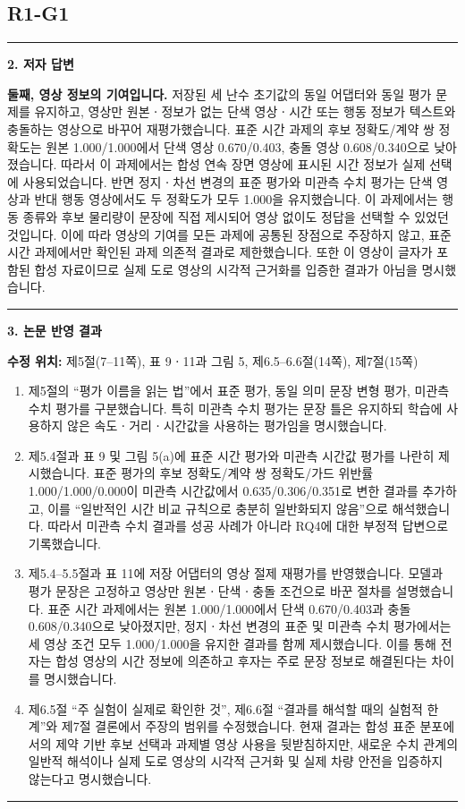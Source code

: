 \documentclass[11pt]{article}
\newcommand{\fieldheading}[2]{%
  \par\medskip\noindent
  {\color{#1}\rule{3pt}{1.25em}}\hspace{0.55em}\textbf{#2}\par\smallskip}
\newenvironment{reviewitem}[1]
  {\subsection*{#1}}
  {\par\medskip\hrule\bigskip}
\newenvironment{authorresponse}
  {\fieldheading{responsecolor}{2. 저자 답변}}
  {\par}
\newenvironment{manuscriptrevision}[1]
  {\fieldheading{revisioncolor}{3. 논문 반영 결과}%
   \textbf{수정 위치:} #1\par\smallskip}
  {\par}
\begin{document}
\begin{reviewitem}{R1-G1}
\begin{authorresponse}
    \textbf{둘째, 영상 정보의 기여입니다.} 저장된 세 난수 초기값의 동일 어댑터와
    동일 평가 문제를 유지하고, 영상만 원본ㆍ정보가 없는 단색 영상ㆍ시간 또는 행동
    정보가 텍스트와 충돌하는 영상으로 바꾸어 재평가했습니다. 표준 시간 과제의 후보
    정확도/계약 쌍 정확도는 원본 1.000/1.000에서 단색 영상 0.670/0.403, 충돌 영상
    0.608/0.340으로 낮아졌습니다. 따라서 이 과제에서는 합성 연속 장면 영상에 표시된
    시간 정보가 실제 선택에 사용되었습니다. 반면 정지ㆍ차선 변경의 표준 평가와
    미관측 수치 평가는 단색 영상과 반대 행동 영상에서도 두 정확도가 모두 1.000을
    유지했습니다. 이 과제에서는 행동 종류와 후보 물리량이 문장에 직접 제시되어
    영상 없이도 정답을 선택할 수 있었던 것입니다. 이에 따라 영상의 기여를 모든
    과제에 공통된 장점으로 주장하지 않고, 표준 시간 과제에서만 확인된 과제 의존적
    결과로 제한했습니다. 또한 이 영상이 글자가 포함된 합성 자료이므로 실제 도로
    영상의 시각적 근거화를 입증한 결과가 아님을 명시했습니다.
  \end{authorresponse}

  \begin{manuscriptrevision}{제5절(7--11쪽), 표 9ㆍ11과 그림 5, 제6.5--6.6절(14쪽), 제7절(15쪽)}
    \begin{enumerate}
      \item 제5절의 ``평가 이름을 읽는 법''에서 표준 평가, 동일 의미 문장 변형
      평가, 미관측 수치 평가를 구분했습니다. 특히 미관측 수치 평가는 문장 틀은
      유지하되 학습에 사용하지 않은 속도ㆍ거리ㆍ시간값을 사용하는 평가임을
      명시했습니다.

      \item 제5.4절과 표 9 및 그림 5(a)에 표준 시간 평가와 미관측 시간값 평가를
      나란히 제시했습니다. 표준 평가의 후보 정확도/계약 쌍 정확도/가드 위반률
      1.000/1.000/0.000이 미관측 시간값에서 0.635/0.306/0.351로 변한 결과를
      추가하고, 이를 ``일반적인 시간 비교 규칙으로 충분히 일반화되지 않음''으로
      해석했습니다. 따라서 미관측 수치 결과를 성공 사례가 아니라 RQ4에 대한
      부정적 답변으로 기록했습니다.

      \item 제5.4--5.5절과 표 11에 저장 어댑터의 영상 절제 재평가를 반영했습니다.
      모델과 평가 문장은 고정하고 영상만 원본ㆍ단색ㆍ충돌 조건으로 바꾼 절차를
      설명했습니다. 표준 시간 과제에서는 원본 1.000/1.000에서 단색
      0.670/0.403과 충돌 0.608/0.340으로 낮아졌지만, 정지ㆍ차선 변경의 표준 및
      미관측 수치 평가에서는 세 영상 조건 모두 1.000/1.000을 유지한 결과를 함께
      제시했습니다. 이를 통해 전자는 합성 영상의 시간 정보에 의존하고 후자는 주로
      문장 정보로 해결된다는 차이를 명시했습니다.

      \item 제6.5절 ``주 실험이 실제로 확인한 것'', 제6.6절 ``결과를 해석할 때의
      실험적 한계''와 제7절 결론에서 주장의 범위를 수정했습니다. 현재 결과는 합성
      표준 분포에서의 제약 기반 후보 선택과 과제별 영상 사용을 뒷받침하지만,
      새로운 수치 관계의 일반적 해석이나 실제 도로 영상의 시각적 근거화 및 실제
      차량 안전을 입증하지 않는다고 명시했습니다.
    \end{enumerate}
  \end{manuscriptrevision}
\end{reviewitem}
\end{document}
